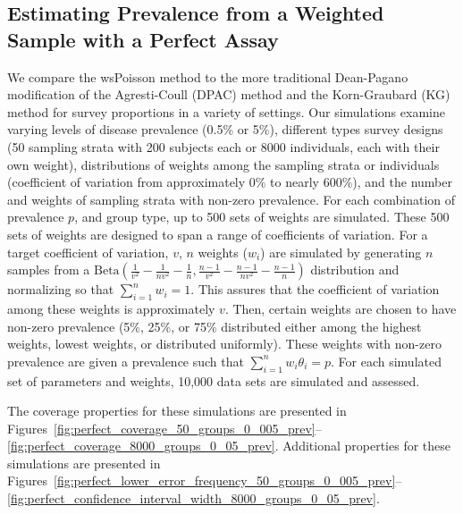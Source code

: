 \documentclass[AMA,STIX1COL]{WileyNJD-v2}
\begin{document}
\subsection{Estimating Prevalence from a Weighted Sample with a Perfect Assay}
\label{sim-perfect}
We compare the wsPoisson method to the more traditional Dean-Pagano modification of the Agresti-Coull (DPAC) method and the Korn-Graubard (KG) method for survey proportions in a variety of settings.
Our simulations examine varying levels of disease prevalence (0.5\% or 5\%), different types  survey designs (50 sampling strata with  200 subjects each or 8000 individuals, each with their own weight), distributions of weights among the sampling strata or individuals (coefficient of variation from approximately 0\% to nearly 600\%), and the number and weights of sampling strata with non-zero prevalence.
For each combination of prevalence \( p \), and group type, up to 500 sets of weights are simulated.
These 500 sets of weights are designed to span a range of coefficients of variation.
For a target coefficient of variation, \( v \), \( n \) weights (\(w_i\)) are simulated by generating \( n \) samples from a \( \text{Beta} \left(\frac{1}{v^2} - \frac{1}{nv^2} - \frac{1}{n}, \frac{n-1}{v^2} - \frac{n-1}{nv^2} - \frac{n-1}{n} \right) \) distribution and normalizing so that \( \sum_{i=1}^n w_i = 1 \).
This assures that the coefficient of variation among these weights is approximately \( v \).
Then, certain weights are chosen to have non-zero prevalence (5\%, 25\%, or 75\% distributed either among the highest weights, lowest weights, or distributed uniformly).
These weights with non-zero prevalence are given a prevalence such that \( \sum_{i=1}^n w_i \theta_i = p \).
For each simulated set of parameters and weights, 10,000 data sets are simulated and assessed. 

The coverage properties for these simulations are presented in Figures~\ref{fig:perfect_coverage_50_groups_0_005_prev}--\ref{fig:perfect_coverage_8000_groups_0_05_prev}.
Additional properties for these simulations are presented in Figures~\ref{fig:perfect_lower_error_frequency_50_groups_0_005_prev}--\ref{fig:perfect_confidence_interval_width_8000_groups_0_05_prev}.
\end{document}
